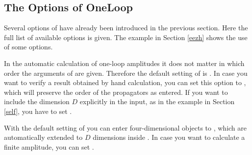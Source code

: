 \enom


\subsection{The Options of OneLoop}
\label{oneopt}
Several options of  have already been introduced in the previous
section.
Here the full list of available options is given. 
The example  in Section \ref{eezh} shows the use of some options.

In the automatic calculation of one-loop amplitudes it does not matter in which order the 
arguments of  are given. Therefore the default setting of 
is . In case you want to verify a result obtained by hand calculation, you can set this 
option to , which will preserve the order of the propagators as entered.
If you want to include the dimension $D$ explicitly in the input, as in the example
in Section \ref{self}, you have to set .

With the default setting of  you can enter four-dimensional objects to 
, which are automatically extended to $D$ dimensions inside .
In case you want to calculate a finite amplitude, you can set .


